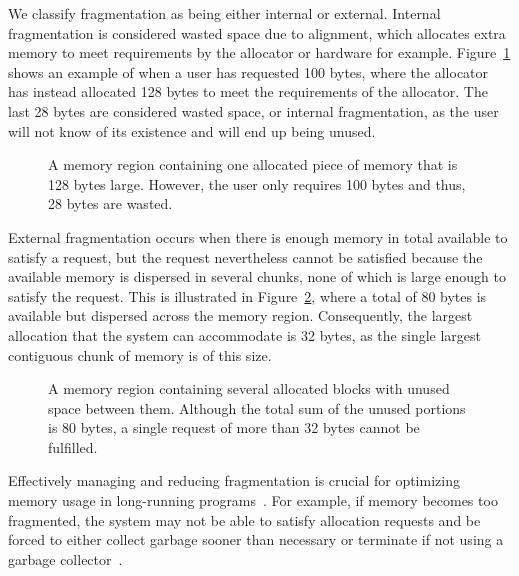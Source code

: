 
We classify fragmentation as being either internal or external. Internal fragmentation is considered wasted space due to alignment, which allocates extra memory to meet requirements by the allocator or hardware for example. Figure~\ref{fig:internal_fragmentation} shows an example of when a user has requested 100 bytes, where the allocator has instead allocated 128 bytes to meet the requirements of the allocator. The last 28 bytes are considered wasted space, or internal fragmentation, as the user will not know of its existence and will end up being unused.

\begin{figure}[H]
    \centering
    \vspace*{0.2cm}
    
    \vspace*{0.2cm}
    \caption{A memory region containing one allocated piece of memory that is 128 bytes large. However, the user only requires 100 bytes and thus, 28 bytes are wasted.}
    \label{fig:internal_fragmentation}
\end{figure}

External fragmentation occurs when there is enough memory in total available to satisfy a request, but the request nevertheless cannot be satisfied because the available memory is dispersed in several chunks, none of which is large enough to satisfy the request. This is illustrated in Figure~\ref{fig:external_fragmentation}, where a total of 80 bytes is available but dispersed across the memory region. Consequently, the largest allocation that the system can accommodate is 32 bytes, as the single largest contiguous chunk of memory is of this size.

\begin{figure}[H]
    \centering
    \vspace*{0.2cm}
    \hspace*{1.2cm}
    
    \vspace*{0.2cm}
    \caption{A memory region containing several allocated blocks with unused space between them. Although the total sum of the unused portions is 80 bytes, a single request of more than 32 bytes cannot be fulfilled.}
    \label{fig:external_fragmentation}
\end{figure}

Effectively managing and reducing fragmentation is crucial for optimizing memory usage in long-running programs~\cite{gchandbook}. For example, if memory becomes too fragmented, the system may not be able to satisfy allocation requests and be forced to either collect garbage sooner than necessary or terminate if not using a garbage collector~\cite{gchandbook}.

